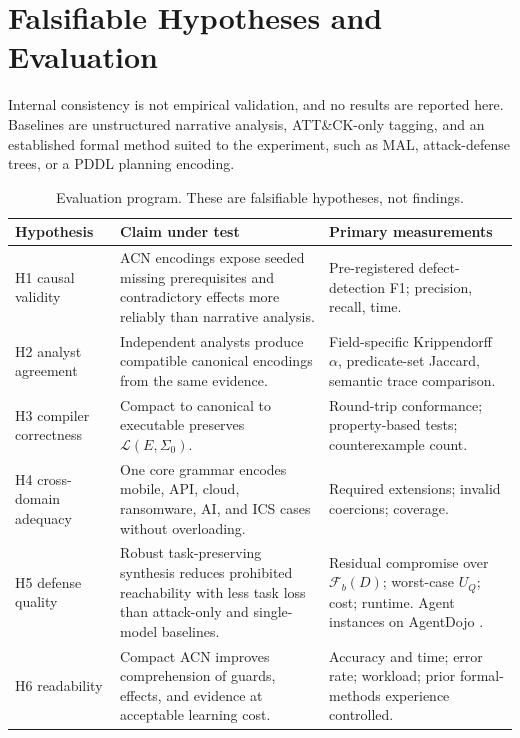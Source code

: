 \documentclass[11pt,letterpaper]{article}
\theoremstyle{definition}
\newcommand{\St}{\Sigma}
\newcommand{\Lang}{\mathcal{L}}
\newcommand{\Fam}{\mathcal{F}}
\begin{document}
\section{Falsifiable Hypotheses and Evaluation}\label{sec:eval}

Internal consistency is not empirical validation, and no results are reported here. Baselines are unstructured narrative analysis, ATT\&CK-only tagging, and an established formal method suited to the experiment, such as MAL, attack-defense trees, or a PDDL planning encoding.

\begin{table}[t]
\centering\small
\caption{Evaluation program. These are falsifiable hypotheses, not findings.}\label{tab:eval}
\begin{tabularx}{\textwidth}{@{}l X X@{}}
\toprule
Hypothesis & Claim under test & Primary measurements \\
\midrule
H1 causal validity & ACN encodings expose seeded missing prerequisites and contradictory effects more reliably than narrative analysis. & Pre-registered defect-detection F1; precision, recall, time. \\
H2 analyst agreement & Independent analysts produce compatible canonical encodings from the same evidence. & Field-specific Krippendorff $\alpha$, predicate-set Jaccard, semantic trace comparison. \\
H3 compiler correctness & Compact to canonical to executable preserves $\Lang(E,\St_0)$. & Round-trip conformance; property-based tests; counterexample count. \\
H4 cross-domain adequacy & One core grammar encodes mobile, API, cloud, ransomware, AI, and ICS cases without overloading. & Required extensions; invalid coercions; coverage. \\
H5 defense quality & Robust task-preserving synthesis reduces prohibited reachability with less task loss than attack-only and single-model baselines. & Residual compromise over $\Fam_b(D)$; worst-case $U_Q$; cost; runtime. Agent instances on AgentDojo \cite{agentdojo}. \\
H6 readability & Compact ACN improves comprehension of guards, effects, and evidence at acceptable learning cost. & Accuracy and time; error rate; workload; prior formal-methods experience controlled. \\
\bottomrule
\end{tabularx}
\end{table}
\end{document}
